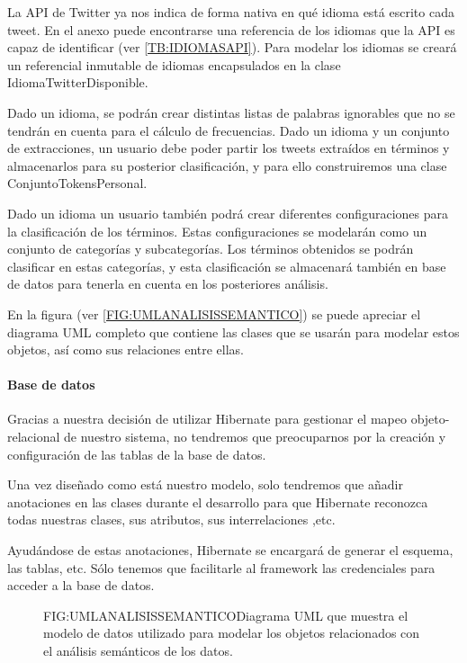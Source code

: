 La API de Twitter ya nos indica de forma nativa en qué idioma está escrito cada tweet. En el anexo puede encontrarse una referencia de los idiomas que la API es capaz de identificar (ver \ref{TB:IDIOMASAPI}). Para modelar los idiomas se creará un referencial inmutable de idiomas encapsulados en la clase IdiomaTwitterDisponible.

Dado un idioma, se podrán crear distintas listas de palabras ignorables que no se tendrán en cuenta para el cálculo de frecuencias.
Dado un idioma y un conjunto de extracciones, un usuario debe poder partir los tweets extraídos en términos y almacenarlos para su posterior clasificación, y para ello construiremos una clase ConjuntoTokensPersonal.

Dado un idioma un usuario también podrá crear diferentes configuraciones para la clasificación de los términos. Estas configuraciones se modelarán como un conjunto de categorías y subcategorías.
Los términos obtenidos se podrán clasificar en estas categorías, y esta clasificación se almacenará también en base de datos para tenerla en cuenta en los posteriores análisis.

En la figura (ver \ref{FIG:UMLANALISISSEMANTICO}) se puede apreciar el diagrama UML completo que contiene las clases que se usarán para modelar estos objetos, así como sus relaciones entre ellas.

\paragraph{Base de datos}
Gracias a nuestra decisión de utilizar Hibernate para gestionar el mapeo objeto-relacional de nuestro sistema, no tendremos que preocuparnos por la creación y configuración de las tablas de la base de datos.

Una vez diseñado como está nuestro modelo, solo tendremos que añadir anotaciones en las clases durante el desarrollo para que Hibernate reconozca todas nuestras clases, sus atributos, sus interrelaciones ,etc. 

Ayudándose de estas anotaciones, Hibernate se encargará de generar el esquema, las tablas, etc. Sólo tenemos que facilitarle al framework las credenciales para acceder a la base de datos.

\begin{figure}[Diagrama UML Análisis Semántico]{FIG:UMLANALISISSEMANTICO}{Diagrama UML que muestra el modelo de datos utilizado para modelar los objetos relacionados con el análisis semánticos de los datos.}
\end{figure}